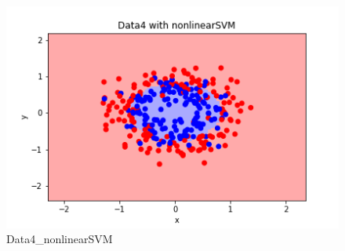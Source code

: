 \begin{figure}[htbp]
\begin{minipage}[t]{0.24\hsize}
  \end{minipage}
  \begin{minipage}[t]{0.24\hsize}
    \centering
    \caption{Data4\_nonlinearSVM}
    \label{graph:4}
    \includegraphics[keepaspectratio, scale=0.3]{fig_20210629132055/Data4_nonlinearSVM.png}
  \end{minipage}
\end{figure}

